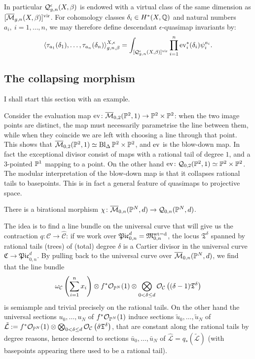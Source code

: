 In particular $\mathcal{Q}^{\epsilon}_{g,n}(X,\beta)$ is endowed with a virtual class of the same dimension as $[\overline{\mathcal{M}}_{g,n}(X,\beta)]^{\mathrm{vir}}$. For cohomology classes $\delta_i\in H^*(X,\mathbb{Q})$ and natural numbers $a_i,\ i=1,\ldots,n$, we may therefore define descendant $\epsilon$-quasimap invariants by:
\[\langle \tau_{a_1}(\delta_1),\ldots,\tau_{a_n}(\delta_n)\rangle^{X,\epsilon}_{g,n,\beta}=\int_{[\mathcal{Q}^{\epsilon}_{g,n}(X,\beta)]^{\mathrm{vir}}}\prod_{i=1}^n \operatorname{ev}_i^*(\delta_i)\psi_i^{a_i}.\]

\subsection{The collapsing morphism}\label{sec:collapsing} I shall start this section with an example.
\begin{ex}\label{ex:lines_in_p2}
 Consider the evaluation map $\operatorname{ev}\colon \overline{\mathcal{M}}_{0,2}(\mathbb P^2,1)\rightarrow \mathbb P^2\times\mathbb P^2$: when the two image points are distinct, the map must necessarily parametrise the line between them, while when they coincide we are left with choosing a line through that point. This shows that $\overline{\mathcal{M}}_{0,2}(\mathbb P^2,1)\simeq \operatorname{Bl}_{\Delta}\mathbb P^2\times\mathbb P^2$, and $\operatorname{ev}$ is the blow-down map. In fact the exceptional divisor consist of maps with a rational tail of degree $1$, and a $3$-pointed $\mathbb P^1$ mapping to a point. On the other hand $\operatorname{ev}\colon \mathcal{Q}_{0,2}(\mathbb P^2,1)\simeq \mathbb P^2\times\mathbb P^2$. The modular interpretation of the blow-down map is that it collapses rational tails to basepoints. This is in fact a general feature of quasimaps to projective space.
\end{ex}

\begin{lem}
 There is a birational  morphism $\chi\colon \overline{\mathcal{M}}_{0,n}(\mathbb P^N,d)\rightarrow \mathcal{Q}_{0,n}(\mathbb P^N,d)$.
\end{lem}

The idea is to find a line bundle on the universal curve that will give us the contraction $q\colon\mathcal C\to\hat{\mathcal C}$: if we work over $\mathfrak{Pic}^d_{0,n}=\mathfrak M_{0,n}^{\rm{wt}=d}$, the locus $\mathfrak T^\delta$ spanned by rational tails (trees) of (total) degree $\delta$ is a Cartier divisor in the universal curve $\mathfrak C\to\mathfrak{Pic}^d_{0,n}$. By pulling back to the universal curve over $\overline{\mathcal{M}}_{0,n}(\mathbb P^N,d)$, we find that the line bundle \[\omega_\mathcal C\left(\sum_{i=1}^n x_i\right)\otimes f^*\mathcal{O}_{\mathbb P^N}(1)\otimes \bigotimes_{0<\delta\leq d}\mathcal{O}_\mathcal C\left((\delta-1)\mathfrak T^\delta\right) \] is semiample and trivial precisely on the rational tails. On the other hand the universal sections $u_0,\ldots,u_N$ of $f^*\mathcal{O}_{\mathbb P^N}(1)$ induce sections $\tilde{u}_0,\ldots,\tilde{u}_N$ of $\tilde{\mathcal L}:=f^*\mathcal{O}_{\mathbb P^N}(1)\otimes \bigotimes_{0<\delta\leq d}\mathcal{O}_\mathcal C\left(\delta\mathfrak T^\delta\right)$, that are constant along the rational tails by degree reasons, hence descend to sections $\bar{u}_0,\ldots,\bar{u}_N$ of $\hat{\mathcal L}=q_*(\tilde{\mathcal L})$ (with basepoints appearing there used to be a rational tail).

